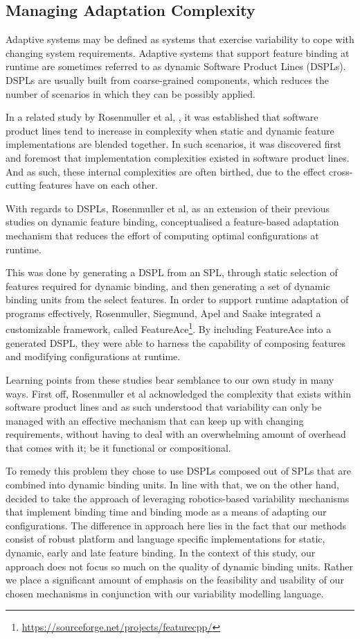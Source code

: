\documentclass[conference]{IEEEtran}
\newcommand{\foot}[1]{\footnote{\url{#1}}}
\begin{document}
\subsection{Managing Adaptation Complexity}
Adaptive systems may be defined as systems that exercise variability to cope with changing system requirements. Adaptive systems that support feature binding at runtime are sometimes referred to as dynamic Software Product Lines (DSPLs). DSPLs are usually built from coarse-grained components, which reduces the number of scenarios in which they can be possibly applied.

In a related study by Rosenmuller et al, \cite{fmod-lang-scenarios}, it was established that software product lines tend to increase in complexity when static and dynamic feature implementations are blended together. In such scenarios, it was discovered first and foremost that implementation complexities existed in software product lines. And as such, these internal complexities are often birthed, due to the effect cross-cutting features have on each other.

With regards to DSPLs, Rosenmuller et al, as an extension of their previous studies on dynamic feature binding, \cite{tailor-spl} conceptualised a feature-based adaptation mechanism that reduces the effort of computing optimal configurations at runtime.

This was done by generating a DSPL from an SPL, through static selection of features required for dynamic binding, and then generating a set of dynamic binding units from the select features. In order to support runtime adaptation of programs effectively, Rosenmuller, Siegmund, Apel and Saake integrated a customizable framework, called FeatureAce\foot{https://sourceforge.net/projects/featurecpp/}. By including FeatureAce into a generated DSPL, they were able to harness the capability of composing features and modifying configurations at runtime.

Learning points from these studies bear semblance to our own study in many ways. First off, Rosenmuller et al\cite{tailor-spl} acknowledged the complexity that exists within software product lines and as such understood that variability can only be managed with an effective mechanism that can keep up with changing requirements, without having to deal with an overwhelming amount of overhead that comes with it; be it functional or compositional.

To remedy this problem they chose to use DSPLs composed out of SPLs that are combined into dynamic binding units. In line with that, we on the other hand, decided to take the approach of leveraging robotics-based variability mechanisms that implement binding time and binding mode as a means of adapting our configurations. The difference in approach here lies in the fact that our methods consist of robust platform and language specific implementations for static, dynamic, early and late feature binding. In the context of this study, our approach does not focus so much on the quality of dynamic binding units. Rather we place a significant amount of emphasis on the feasibility and usability of our chosen mechanisms in conjunction with our variability modelling language.
 
\end{document}
